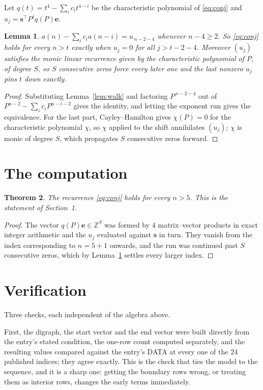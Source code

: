 \documentclass[11pt,a4paper]{article}
\theoremstyle{plain}
\newtheorem{theorem}{Theorem}
\newtheorem{lemma}[theorem]{Lemma}
\theoremstyle{definition}
\begin{document}
Let $q(t)=t^{4}-\sum_i c_i t^{4-i}$ be the characteristic polynomial of
\eqref{eq:conj} and $u_j=\mathbf{s}^{\!\top}P^{j}q(P)\mathbf{e}$.

\begin{lemma}\label{lem:crit}
$a(n)-\sum_i c_i a(n-i)=u_{\,n-2-4}$ whenever $n-4\ge2$. So \eqref{eq:conj}
holds for every $n>t$ exactly when $u_j=0$ for all $j>t-2-4$. Moreover $(u_j)$
satisfies the monic linear recurrence given by the characteristic polynomial of $P$, of
degree $S$, so $S$ consecutive zeros force every later one and the last nonzero $u_j$ pins
$t$ down exactly.
\end{lemma}

\begin{proof}
Substituting Lemma~\ref{lem:walk} and factoring $P^{\,n-2-4}$ out of
$P^{n-2}-\sum_i c_i P^{n-i-2}$ gives the identity, and letting the exponent run gives the
equivalence. For the last part, Cayley--Hamilton gives $\chi(P)=0$ for the characteristic
polynomial $\chi$, so $\chi$ applied to the shift annihilates $(u_j)$; $\chi$ is monic of
degree $S$, which propagates $S$ consecutive zeros forward.
\end{proof}

\section{The computation}

\begin{theorem}
The recurrence \eqref{eq:conj} holds for every $n>5$. This is the statement of
Section~1.
\end{theorem}

\begin{proof}
The vector $q(P)\mathbf{e}\in\mathbb{Z}^{S}$ was formed by $4$ matrix--vector
products in exact integer arithmetic and the $u_j$ evaluated against $\mathbf{s}$ in turn.
They vanish from the index corresponding to $n=5+1$ onwards, and the run was continued
past $S$ consecutive zeros, which by Lemma~\ref{lem:crit} settles every larger index.
\end{proof}

\section{Verification}

Three checks, each independent of the algebra above.

First, the digraph, the start vector and the end vector were built directly from the
entry's stated condition, the one-row count computed separately, and the resulting values
compared against the entry's DATA at every one of the $24$ published indices; they
agree exactly. This is the check that ties the model to the sequence, and it is a sharp one:
getting the boundary rows wrong, or treating them as interior rows, changes the early terms
immediately.
\end{document}
